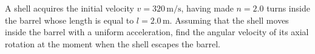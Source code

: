 
\item A shell acquires the initial velocity \(v = 320 \, \text{m/s}\), having made \(n = 2.0\) turns inside the barrel whose length is equal to \(l = 2.0 \, \text{m}\). Assuming that the shell moves inside the barrel with a uniform acceleration, find the angular velocity of its axial rotation at the moment when the shell escapes the barrel.
    \begin{center}
    \end{center}
